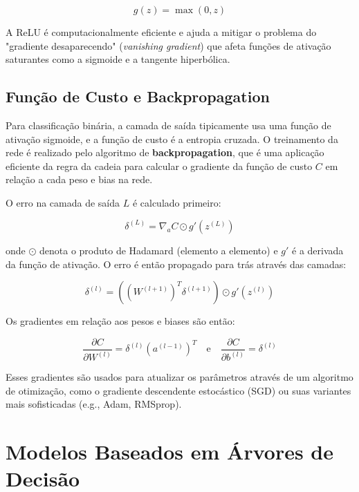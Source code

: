 \documentclass[12pt, a4paper, oneside]{report}
\begin{document}
\begin{equation}
    g(z) = \max(0, z)
\end{equation}

A ReLU é computacionalmente eficiente e ajuda a mitigar o problema do "gradiente desaparecendo" (\textit{vanishing gradient}) que afeta funções de ativação saturantes como a sigmoide e a tangente hiperbólica.

\subsection{Função de Custo e Backpropagation}

Para classificação binária, a camada de saída tipicamente usa uma função de ativação sigmoide, e a função de custo é a entropia cruzada. O treinamento da rede é realizado pelo algoritmo de \textbf{backpropagation}, que é uma aplicação eficiente da regra da cadeia para calcular o gradiente da função de custo $C$ em relação a cada peso e bias na rede.

O erro na camada de saída $L$ é calculado primeiro:

\begin{equation}
    \delta^{(L)} = \nabla_a C \odot g'(z^{(L)})
\end{equation}

onde $\odot$ denota o produto de Hadamard (elemento a elemento) e $g'$ é a derivada da função de ativação. O erro é então propagado para trás através das camadas:

\begin{equation}
    \delta^{(l)} = ((W^{(l+1)})^T \delta^{(l+1)}) \odot g'(z^{(l)})
\end{equation}

Os gradientes em relação aos pesos e biases são então:

\begin{equation}
    \frac{\partial C}{\partial W^{(l)}} = \delta^{(l)} (a^{(l-1)})^T \quad \text{e} \quad \frac{\partial C}{\partial b^{(l)}} = \delta^{(l)}
\end{equation}

Esses gradientes são usados para atualizar os parâmetros através de um algoritmo de otimização, como o gradiente descendente estocástico (SGD) ou suas variantes mais sofisticadas (e.g., Adam, RMSprop).

\section{Modelos Baseados em Árvores de Decisão}
\end{document}
